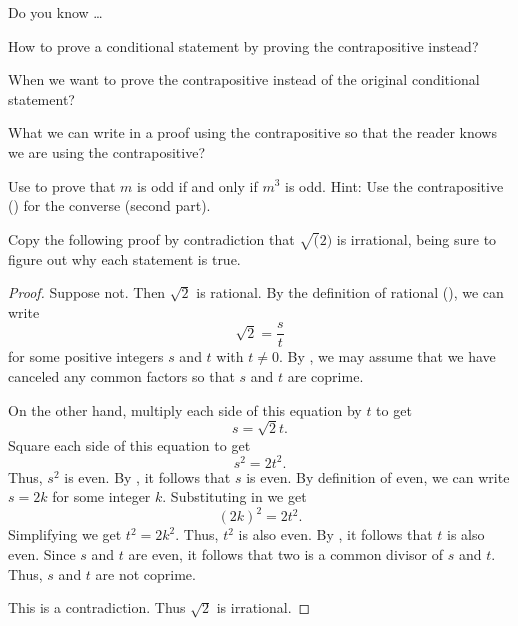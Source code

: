 \begin{exer}[\exerR] %
\label{exer_dyk_pff_cp}
    Do you know \ldots
        \begin{exerpart}
            \item How to prove a conditional statement by proving the contrapositive instead?
            \item When we want to prove the contrapositive instead of the original conditional statement?
            \item What we can write in a proof using the contrapositive so that the reader knows we are using the contrapositive?
        \end{exerpart}
\end{exer}

\begin{exer}[\exerE] %
\label{exer_proof_iff_using_cp_evens}
    Use  to prove that $m$ is odd if and only if $m^3$ is odd.  Hint: Use the contrapositive () for the converse (second part).  
\end{exer}

\begin{exer}[\exerE] %
\label{part_prove_sqrtp_irrat} 
    Copy the following proof by contradiction that $\sqrt(2)$ is irrational, being sure to figure out why each statement is true.

        \begin{proof}
            Suppose not.  Then $\sqrt{2}$ is rational.  By the definition of rational (), we can write $$\sqrt{2} = \frac{s}{t}$$ for some positive integers $s$ and $t$ with $t \neq 0$. By , we may assume that we have canceled any common factors so that $s$ and $t$ are coprime.
            
            On the other hand, multiply each side of this equation by $t$ to get $$s = \sqrt{2}t.$$  Square each side of this equation to get $$s^2=2t^2.$$ Thus, $s^2$ is even.  By , it follows that $s$ is even.  By definition of even,  we can write $s = 2k$ for some integer $k$.  Substituting in we get $$(2k)^2 = 2t^2.$$
            Simplifying we get $t^2=2k^2$. Thus, $t^2$ is also even. By , it follows that $t$ is also even.  Since $s$ and $t$ are even, it follows that two is a common divisor of $s$ and $t$. Thus, $s$ and $t$ are not coprime.
            
            This is a contradiction.  Thus $\sqrt{2}$ is irrational.
        \end{proof}
\end{exer}

